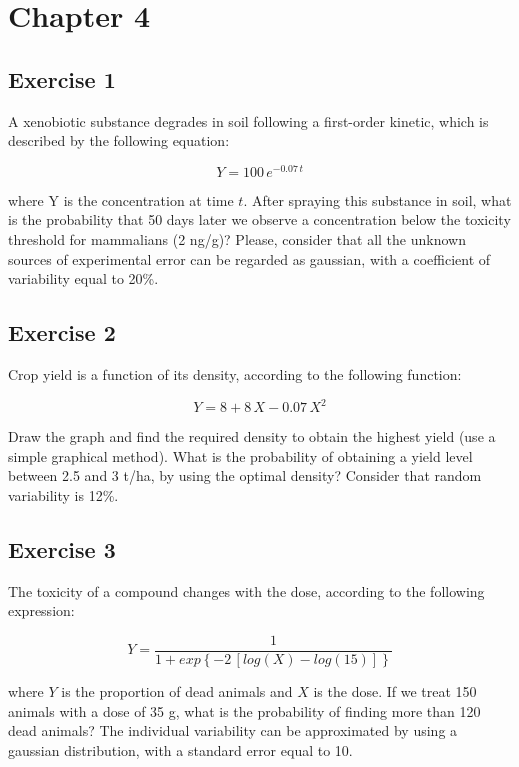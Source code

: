 \documentclass[a4paper,12pt,oneside]{book}
\begin{document}
\hypertarget{chapter-4}{%
\section{Chapter 4}\label{chapter-4}}

\hypertarget{exercise-1-1}{%
\subsection{Exercise 1}\label{exercise-1-1}}

A xenobiotic substance degrades in soil following a first-order kinetic, which is described by the following equation:

\[Y = 100 \, e^{-0.07 \, t}\]

where Y is the concentration at time \(t\). After spraying this substance in soil, what is the probability that 50 days later we observe a concentration below the toxicity threshold for mammalians (2 ng/g)? Please, consider that all the unknown sources of experimental error can be regarded as gaussian, with a coefficient of variability equal to 20\%.

\hypertarget{exercise-2-1}{%
\subsection{Exercise 2}\label{exercise-2-1}}

Crop yield is a function of its density, according to the following function:

\[ Y = 8 + 8 \, X - 0.07 \, X^2\]

Draw the graph and find the required density to obtain the highest yield (use a simple graphical method). What is the probability of obtaining a yield level between 2.5 and 3 t/ha, by using the optimal density? Consider that random variability is 12\%.

\hypertarget{exercise-3-1}{%
\subsection{Exercise 3}\label{exercise-3-1}}

The toxicity of a compound changes with the dose, according to the following expression:

\[ Y = \frac{1}{1 + exp\left\{ -2 \, \left[log(X) - log(15)\right] \right\}}\]

where \(Y\) is the proportion of dead animals and \(X\) is the dose. If we treat 150 animals with a dose of 35 g, what is the probability of finding more than 120 dead animals? The individual variability can be approximated by using a gaussian distribution, with a standard error equal to 10.
\end{document}
